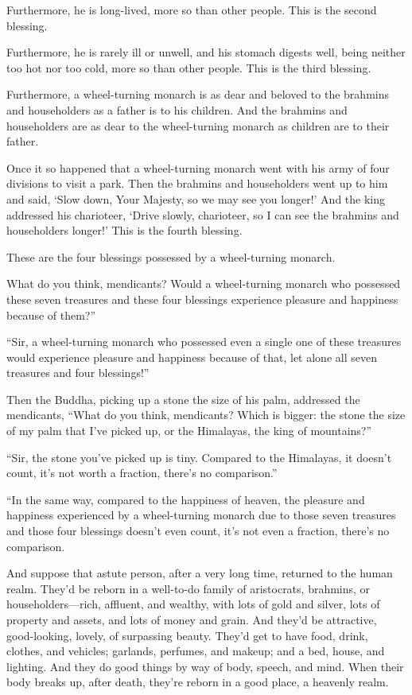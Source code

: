 \documentclass[12pt,openany]{book}%
\begin{document}
Furthermore, he is long-lived, more so than other people. This is the second blessing. 

Furthermore, he is rarely ill or unwell, and his stomach digests well, being neither too hot nor too cold, more so than other people. This is the third blessing. 

Furthermore, a wheel-turning monarch is as dear and beloved to the brahmins and householders as a father is to his children. And the brahmins and householders are as dear to the wheel-turning monarch as children are to their father. 

Once it so happened that a wheel-turning monarch went with his army of four divisions to visit a park. Then the brahmins and householders went up to him and said, ‘Slow down, Your Majesty, so we may see you longer!’ And the king addressed his charioteer, ‘Drive slowly, charioteer, so I can see the brahmins and householders longer!’ This is the fourth blessing. 

These are the four blessings possessed by a wheel-turning monarch. 

What do you think, mendicants? Would a wheel-turning monarch who possessed these seven treasures and these four blessings experience pleasure and happiness because of them?” 

“Sir, a wheel-turning monarch who possessed even a single one of these treasures would experience pleasure and happiness because of that, let alone all seven treasures and four blessings!” 

Then the Buddha, picking up a stone the size of his palm, addressed the mendicants, “What do you think, mendicants? Which is bigger: the stone the size of my palm that I’ve picked up, or the Himalayas, the king of mountains?” 

“Sir, the stone you’ve picked up is tiny. Compared to the Himalayas, it doesn’t count, it’s not worth a fraction, there’s no comparison.” 

“In the same way, compared to the happiness of heaven, the pleasure and happiness experienced by a wheel-turning monarch due to those seven treasures and those four blessings doesn’t even count, it’s not even a fraction, there’s no comparison. 

And suppose that astute person, after a very long time, returned to the human realm. They’d be reborn in a well-to-do family of aristocrats, brahmins, or householders—rich, affluent, and wealthy, with lots of gold and silver, lots of property and assets, and lots of money and grain. And they’d be attractive, good-looking, lovely, of surpassing beauty. They’d get to have food, drink, clothes, and vehicles; garlands, perfumes, and makeup; and a bed, house, and lighting. And they do good things by way of body, speech, and mind. When their body breaks up, after death, they’re reborn in a good place, a heavenly realm. 
\end{document}
